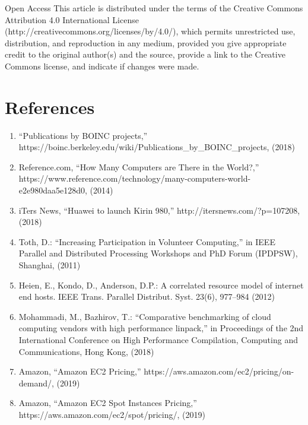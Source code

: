 \documentclass[
]{article}
\begin{document}
Open Access This article is distributed under the terms of the Creative
Commons Attribution 4.0 International License
(http://creativecommons.org/licenses/by/4.0/), which permits
unrestricted use, distribution, and reproduction in any medium, provided
you give appropriate credit to the original author(s) and the source,
provide a link to the Creative Commons license, and indicate if changes
were made.

\section{References}\label{references}

\begin{enumerate}
\def\labelenumi{\arabic{enumi}.}
\item
  ``Publications by BOINC projects,''
  https://boinc.berkeley.edu/wiki/Publications\_by\_BOINC\_projects,
  (2018)\\
\item
  Reference.com, ``How Many Computers are There in the World?,''
  https://www.reference.com/technology/many-computers-world-e2e980daa5e128d0,
  (2014)\\
\item
  iTers News, ``Huawei to launch Kirin 980,''
  http://itersnews.com/?p=107208, (2018)\\
\item
  Toth, D.: ``Increasing Participation in Volunteer Computing,'' in IEEE
  Parallel and Distributed Processing Workshops and PhD Forum (IPDPSW),
  Shanghai, (2011)\\
\item
  Heien, E., Kondo, D., Anderson, D.P.: A correlated resource model of
  internet end hosts. IEEE Trans. Parallel Distribut. Syst. 23(6),
  977--984 (2012)\\
\item
  Mohammadi, M., Bazhirov, T.: ``Comparative benchmarking of cloud
  computing vendors with high performance linpack,'' in Proceedings of
  the 2nd International Conference on High Performance Compilation,
  Computing and Communications, Hong Kong, (2018)\\
\item
  Amazon, ``Amazon EC2 Pricing,''
  https://aws.amazon.com/ec2/pricing/on-demand/, (2019)\\
\item
  Amazon, ``Amazon EC2 Spot Instances Pricing,''
  https://aws.amazon.com/ec2/spot/pricing/, (2019)\\

\end{enumerate}
\end{document}
